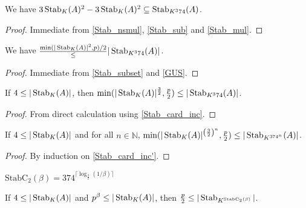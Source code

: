 \begin{lemma}
    \label{Stab_subset}
    \leanok
    We have $3 \operatorname{\operatorname{Stab}}_K(A)^2 - 3 \operatorname{\operatorname{Stab}}_K(A)^2 \subseteq \operatorname{\operatorname{Stab}}_{K^374}(A)$.
\end{lemma}

\begin{proof}
    \leanok
    Immediate from \ref{Stab_nsmul}, \ref{Stab_sub} and \ref{Stab_mul}.
\end{proof}

\begin{lemma}
    \label{Stab_card_inc}
    \leanok
    We have $\frac{\min(|\operatorname{\operatorname{Stab}}_K(A)|^2, p) / 2} \leq |\operatorname{\operatorname{Stab}}_{K^374}(A)|$.
\end{lemma}

\begin{proof}
    \leanok
    Immediate from \ref{Stab_subset} and \ref{GUS}.
\end{proof}

\begin{lemma}
    \label{Stab_card_inc'}
    \leanok
    If $4 \leq |\operatorname{\operatorname{Stab}}_K(A)|$, then $\min(|\operatorname{\operatorname{Stab}}_K(A)|^{\frac32}, \frac p2) \leq |\operatorname{\operatorname{Stab}}_{K^374}(A)|$.
\end{lemma}

\begin{proof}
    \leanok
    From direct calculation using \ref{Stab_card_inc}.
\end{proof}

\begin{lemma}
    \label{Stab_card_inc_rep}
    \leanok
    If $4 \leq |\operatorname{\operatorname{Stab}}_K(A)|$ and for all $n \in \mathbb{N}$,
    $\min(|\operatorname{\operatorname{Stab}}_K(A)|^{\left(\frac32\right)^n}, \frac p2) \leq |\operatorname{\operatorname{Stab}}_{K^{374^n}}(A)|$.
\end{lemma}

\begin{proof}
    \leanok
    By induction on \ref{Stab_card_inc'}.
\end{proof}

\begin{definition}
    \label{StabC_2}
    \leanok
    $\mathrm{StabC}_2(\beta) = 374^{\lceil \log_{\frac32}(1 / \beta) \rceil}$
\end{definition}

\begin{lemma}
    \label{Stab_full'}
    \leanok
    If $4 \leq |\operatorname{\operatorname{Stab}}_K(A)|$ and $p^\beta \leq |\operatorname{\operatorname{Stab}}_K(A)|$,
    then $\frac{p}2 \leq |\operatorname{\operatorname{Stab}}_{K^{\mathrm{StabC}_2(\beta)}}|$.
\end{lemma}

